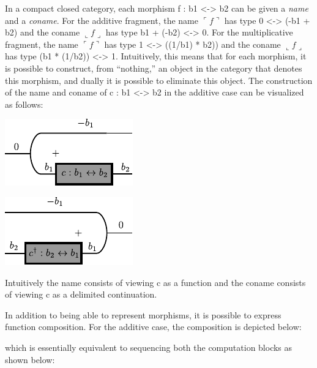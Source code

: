 \documentclass[preprint]{sigplanconf}
\newcommand{\fname}[1]{\ulcorner #1 \urcorner}
\newcommand{\fconame}[1]{\llcorner #1 \lrcorner}
\begin{document}
In a compact closed category, each morphism {{f : b1 <-> b2 }} can be given a
\emph{name} and a \emph{coname}. For the additive fragment, the name
$\fname{f}$ has type {{0 <-> (-b1 + b2)}} and the coname $\fconame{f}$ has type
{{b1 + (-b2) <-> 0}}. For the multiplicative fragment, the name $\fname{f}$ has
type {{1 <-> ((1/b1) * b2))}} and the coname $\fconame{f}$ has type 
{{(b1 * (1/b2)) <-> 1}}. Intuitively, this means that for each morphism, 
it is possible to construct, from ``nothing,'' an object in the category that 
denotes this morphism, and dually it is possible to eliminate this object.
The construction of the name and coname of {{c : b1 <-> b2}} in the additive case 
can be visualized as follows:

\begin{multicols}{2}
\begin{center}
  \includegraphics{diagrams/function.pdf}
\end{center}

\begin{center}
  \includegraphics{diagrams/delimc.pdf}
\end{center}  
\end{multicols}

Intuitively the name consists of viewing {{c}} as a function and the coname
consists of viewing {{c}} as a delimited continuation.

In addition to being able to represent morphisms, it is possible to express
function composition. For the additive case, the composition is depicted
below:

\begin{multicols}{2}

\end{multicols}
which is essentially equivalent to sequencing both the computation blocks as
shown below:
\end{document}

